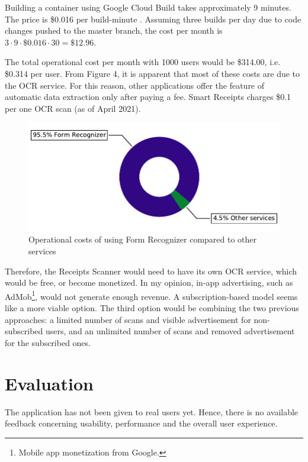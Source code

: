 \documentclass[
  digital, %
  table,   %
  oneside, %
  lof,     %
  lot,     %
]{fithesis3}
\begin{document}
Building a container using Google Cloud Build takes approximately 9 minutes. The price is \$0.016 per build-minute \cite{CloudBuildPricing}. Assuming three builds per day due to code changes pushed to the master branch, the cost per month is $3 \cdot 9 \cdot \$0.016 \cdot 30 = \$12.96$.

The total operational cost per month with \num{1000} users would be \$314.00, i.e. \$0.314 per user.
From Figure 4, it is apparent that most of these costs are due to the OCR service. For this reason, other applications offer the feature of automatic data extraction only after paying a fee. Smart Receipts charges \$0.1 per one OCR scan (as of April 2021).

\begin{figure}
    \begin{center}
        \includegraphics[width=1\textwidth]{figures/graphs/operational_costs}
    \end{center}
    \caption{Operational costs of using Form Recognizer compared to other services}
    \label{fig:operational_costs}
\end{figure}

Therefore, the Receipts Scanner would need to have its own OCR service, which would be free, or become monetized. In my opinion, in-app advertising, such as AdMob\footnote{Mobile app monetization from Google.}, would not generate enough revenue. A subscription-based model seems like a more viable option. The third option would be combining the two previous approaches: a limited number of scans and visible advertisement for non-subscribed users, and an unlimited number of scans and removed advertisement for the subscribed ones.

\chapter{Evaluation}
The application has not been given to real users yet. Hence, there is no available feedback concerning usability, performance and the overall user experience.
\end{document}

